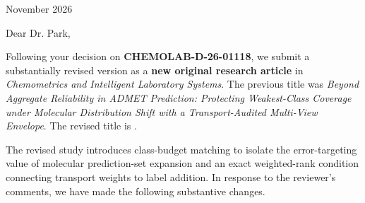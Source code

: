 

 November 2026

\noindent Dear Dr. Park,

Following your decision on \textbf{CHEMOLAB-D-26-01118}, we submit a substantially revised version as a \textbf{new original research article} in \emph{Chemometrics and Intelligent Laboratory Systems}. The previous title was \emph{Beyond Aggregate Reliability in ADMET Prediction: Protecting Weakest-Class Coverage under Molecular Distribution Shift with a Transport-Audited Multi-View Envelope}. The revised title is \emph{\papertitle}.

The revised study introduces class-budget matching to isolate the error-targeting value of molecular prediction-set expansion and an exact weighted-rank condition connecting transport weights to label addition. In response to the reviewer's comments, we have made the following substantive changes.

